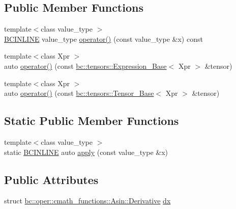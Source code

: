 \subsection*{Public Member Functions}
\begin{DoxyCompactItemize}
\item 
{\footnotesize template$<$class value\+\_\+type $>$ }\\\hyperlink{common_8h_a6699e8b0449da5c0fafb878e59c1d4b1}{B\+C\+I\+N\+L\+I\+NE} value\+\_\+type \hyperlink{structbc_1_1oper_1_1cmath__functions_1_1Asin_af8ec5551f6ea246e1803a729d3310f0c}{operator()} (const value\+\_\+type \&x) const
\item 
{\footnotesize template$<$class Xpr $>$ }\\auto \hyperlink{structbc_1_1oper_1_1cmath__functions_1_1Asin_a2f20510e74c4dd76adf0c75d86689517}{operator()} (const \hyperlink{classbc_1_1tensors_1_1Expression__Base}{bc\+::tensors\+::\+Expression\+\_\+\+Base}$<$ Xpr $>$ \&tensor)
\item 
{\footnotesize template$<$class Xpr $>$ }\\auto \hyperlink{structbc_1_1oper_1_1cmath__functions_1_1Asin_afcfcf86668a54b5dc378476750c9f0da}{operator()} (const \hyperlink{classbc_1_1tensors_1_1Tensor__Base}{bc\+::tensors\+::\+Tensor\+\_\+\+Base}$<$ Xpr $>$ \&tensor)
\end{DoxyCompactItemize}
\subsection*{Static Public Member Functions}
\begin{DoxyCompactItemize}
\item 
{\footnotesize template$<$class value\+\_\+type $>$ }\\static \hyperlink{common_8h_a6699e8b0449da5c0fafb878e59c1d4b1}{B\+C\+I\+N\+L\+I\+NE} auto \hyperlink{structbc_1_1oper_1_1cmath__functions_1_1Asin_adca0c674125baa73bb2445c35b353e45}{apply} (const value\+\_\+type \&x)
\end{DoxyCompactItemize}
\subsection*{Public Attributes}
\begin{DoxyCompactItemize}
\item 
struct \hyperlink{structbc_1_1oper_1_1cmath__functions_1_1Asin_1_1Derivative}{bc\+::oper\+::cmath\+\_\+functions\+::\+Asin\+::\+Derivative} \hyperlink{structbc_1_1oper_1_1cmath__functions_1_1Asin_abcdbbb996217835499d48d5c64ea5a06}{dx}
\end{DoxyCompactItemize}


